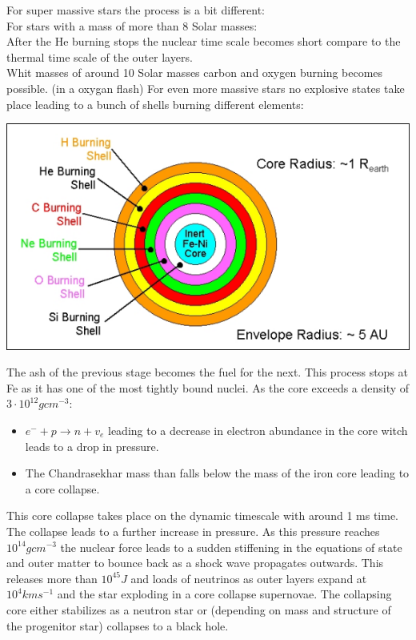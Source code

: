 \documentclass[11pt,a4paper]{article}
\begin{document}
For super massive stars the process is a bit different: \\
For stars with a mass of more than 8 Solar masses: \\ 
After the He burning stops the nuclear time scale becomes short compare to the thermal time scale of the outer layers.\\
Whit masses of around 10 Solar masses carbon and oxygen burning becomes possible. (in a oxygan flash)
For even more massive stars no explosive states take place leading to a bunch of shells burning different elements: 
\begin{center}
    \includegraphics[width=0.5\linewidth]{screenshot_2024-01-23-131219.png}
\end{center}
The ash of the previous stage becomes the fuel for the next.
This process stops at Fe as it has one of the most tightly bound nuclei. 
As the core exceeds a density of $3 \cdot 10^{12} gcm^{-3}$: 
\begin{itemize}
    \item $e^- + p \rightarrow n + v_e  $ leading to a decrease in electron abundance in the core witch leads to a drop in pressure. 
    \item The Chandrasekhar mass than falls below the mass of the iron core leading to a core collapse. 
\end{itemize}
This core collapse takes place on the dynamic timescale with around 1 ms time.
The collapse leads to a further increase in pressure. 
As this pressure reaches $10^{14} gcm^{-3}$ the nuclear force leads to a sudden stiffening in the equations of state and outer matter to bounce back as a shock wave propagates outwards.
This releases more than $10^{45} J$ and loads of neutrinos as outer layers expand at $10^4 kms^{-1}$ and the star exploding in a core collapse supernovae.
The collapsing core either stabilizes as a neutron star or (depending on
mass and structure of the progenitor star) collapses to a black hole.
\end{document}
